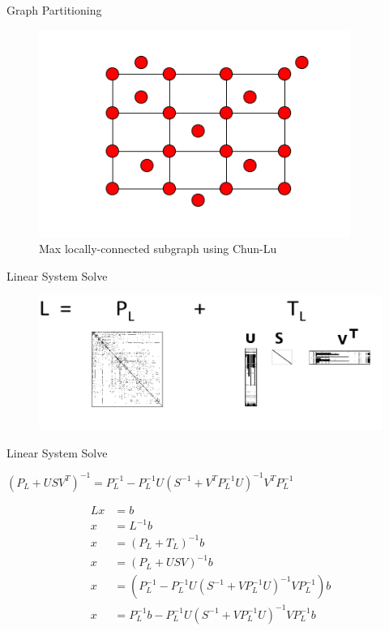 \documentclass[xcolor=dvipsnames,10pt]{beamer}
\begin{document}
\begin{frame}{Graph Partitioning}
\begin{figure}
\begin{center}
\includegraphics[width = 4in]{planargraph.png}
\caption{Max locally-connected subgraph using Chun-Lu \cite{Chung:2004}}
\end{center}
\end{figure}
\end{frame}



\begin{frame}{Linear System Solve}


\begin{figure}
\begin{center}
\includegraphics[width = 4.7in]{svd.png}
\end{center}
\end{figure}

\end{frame}
\begin{frame}{Linear System Solve}
\begin{Definition}
$(P_L + USV^T)^{-1} = P_L^{-1}  - P_L^{-1}U(S^{-1} + V^{T}P_L^{-1}U)^{-1}V^{T}P_L^{-1}$
\end{Definition}
\vspace{.1in}
\begin{align*}
Lx & = b\\
x & = L^{-1}b\\
x & = (P_L+T_L)^{-1}b\\
x & = (P_L+USV)^{-1}b\\
x & = (P_L^{-1}-P_L^{-1}U(S^{-1}+VP_L^{-1}U)^{-1}VP_L^{-1})b\\
x & = P_L^{-1}b-P_L^{-1}U(S^{-1}+VP_L^{-1}U)^{-1}VP_L^{-1}b\\
\end{align*}
\end{frame}
\end{document}
